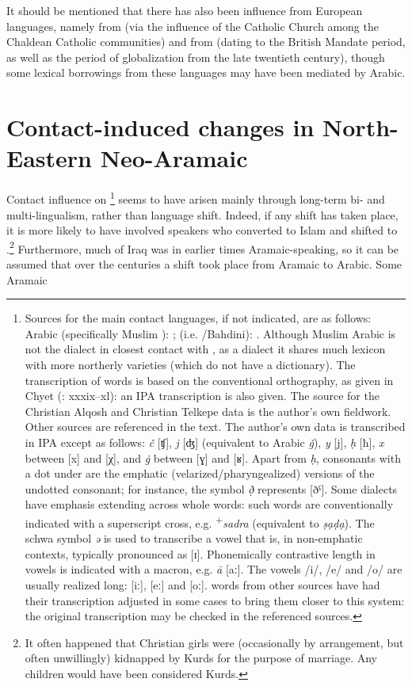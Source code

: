 \documentclass[output=paper]{langsci/langscibook}
\begin{document}
It should be mentioned that there has also been influence from European languages, namely from  (via the influence of the Catholic Church among the Chaldean Catholic communities) and from  (dating to the British Mandate period, as well as the period of globalization from the late twentieth century), though some lexical borrowings from these languages may have been mediated by Arabic.


\section{Contact-induced changes in North-Eastern Neo-Aramaic}

Contact influence on \footnote{Sources for the main contact languages, if not indicated, are as follows:  Arabic (specifically Muslim ): \citet{WoodheadEtAl1967};  (i.e. /Bahdini): \citet{Chyet2003}. Although Muslim  Arabic is not the dialect in closest contact with , as a  dialect it shares much lexicon with more northerly varieties (which do not have a dictionary). The transcription of  words is based on the conventional {orthography}, as given in Chyet (\citeyear{Chyet2003}: xxxix–xl): an IPA transcription is also given. The source for the Christian Alqosh and Christian Telkepe data is the author’s own fieldwork. Other sources are referenced in the text. The author’s own  data is transcribed in IPA except as follows: \textit{č} [ʧ], \textit{j} [ʤ] (equivalent to Arabic \textit{ǧ}), \textit{y} [j], \textit{ḥ} [ħ], \textit{x} between [x] and [χ], and \textit{\.g} between [ɣ] and [ʁ]. Apart from \textit{ḥ}, consonants with a dot under are the {emphatic} (velarized/{pharyngealized}) versions of the undotted consonant; for instance, the symbol \textit{ð̣} represents [ðˤ]. Some dialects have {emphasis} extending across whole words: such words are conventionally indicated with a superscript cross, e.g. \textrm{\textsuperscript{+}}\textrm{\textit{sadra} }\textrm{(equivalent to} \textrm{\textit{ṣạḍ{\R}ạ}}). The schwa symbol \textit{ə} is used to transcribe a  vowel that is, in non-{emphatic} contexts, typically pronounced as [ɪ]. Phonemically contrastive length in vowels is indicated with a macron, e.g. \textit{ā} [aː]. The vowels /i/, /e/ and /o/ are usually realized long: [iː], [eː] and [oː].  words from other sources have had their transcription adjusted in some cases to bring them closer to this system: the original transcription may be checked in the referenced sources.} seems to have arisen mainly through long-term bi- and multi-lingualism, rather than {language shift}. Indeed, if any shift has taken place, it is more likely to have involved  speakers who converted to Islam and shifted to .\footnote{It often happened that Christian girls were (occasionally by arrangement, but often unwillingly) kidnapped by {Kurds} for the purpose of marriage. Any children would have been considered {Kurds}.} Furthermore, much of Iraq was in earlier times Aramaic-speaking, so it can be assumed that over the centuries a shift took place from Aramaic to Arabic. Some Aramaic 
\end{document}
